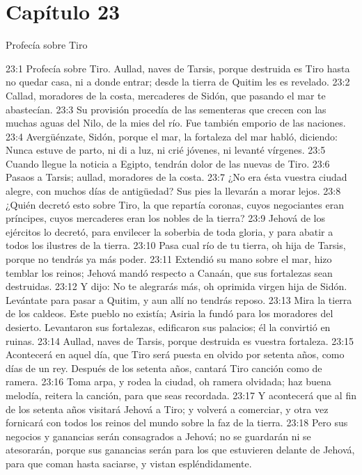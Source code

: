 \section*{Capítulo 23 }
Profecía sobre Tiro 
 
23:1 Profecía sobre Tiro. Aullad, naves de Tarsis, porque destruida es Tiro hasta no quedar casa, ni a donde entrar; desde la tierra de Quitim les es revelado. 
23:2 Callad, moradores de la costa, mercaderes de Sidón, que pasando el mar te abastecían. 
23:3 Su provisión procedía de las sementeras que crecen con las muchas aguas del Nilo, de la mies del río. Fue también emporio de las naciones. 
23:4 Avergüénzate, Sidón, porque el mar, la fortaleza del mar habló, diciendo: Nunca estuve de parto, ni di a luz, ni crié jóvenes, ni levanté vírgenes. 
23:5 Cuando llegue la noticia a Egipto, tendrán dolor de las nuevas de Tiro. 
23:6 Pasaos a Tarsis; aullad, moradores de la costa. 
23:7 ¿No era ésta vuestra ciudad alegre, con muchos días de antigüedad? Sus pies la llevarán a morar lejos. 
23:8 ¿Quién decretó esto sobre Tiro, la que repartía coronas, cuyos negociantes eran príncipes, cuyos mercaderes eran los nobles de la tierra? 
23:9 Jehová de los ejércitos lo decretó, para envilecer la soberbia de toda gloria, y para abatir a todos los ilustres de la tierra. 
23:10 Pasa cual río de tu tierra, oh hija de Tarsis, porque no tendrás ya más poder. 
23:11 Extendió su mano sobre el mar, hizo temblar los reinos; Jehová mandó respecto a Canaán, que sus fortalezas sean destruidas. 
23:12 Y dijo: No te alegrarás más, oh oprimida virgen hija de Sidón. Levántate para pasar a Quitim, y aun allí no tendrás reposo. 
23:13 Mira la tierra de los caldeos. Este pueblo no existía; Asiria la fundó para los moradores del desierto. Levantaron sus fortalezas, edificaron sus palacios; él la convirtió en ruinas. 
23:14 Aullad, naves de Tarsis, porque destruida es vuestra fortaleza. 
23:15 Acontecerá en aquel día, que Tiro será puesta en olvido por setenta años, como días de un rey. Después de los setenta años, cantará Tiro canción como de ramera. 
23:16 Toma arpa, y rodea la ciudad, oh ramera olvidada; haz buena melodía, reitera la canción, para que seas recordada. 
23:17 Y acontecerá que al fin de los setenta años visitará Jehová a Tiro; y volverá a comerciar, y otra vez fornicará con todos los reinos del mundo sobre la faz de la tierra. 
23:18 Pero sus negocios y ganancias serán consagrados a Jehová; no se guardarán ni se atesorarán, porque sus ganancias serán para los que estuvieren delante de Jehová, para que coman hasta saciarse, y vistan espléndidamente. 
